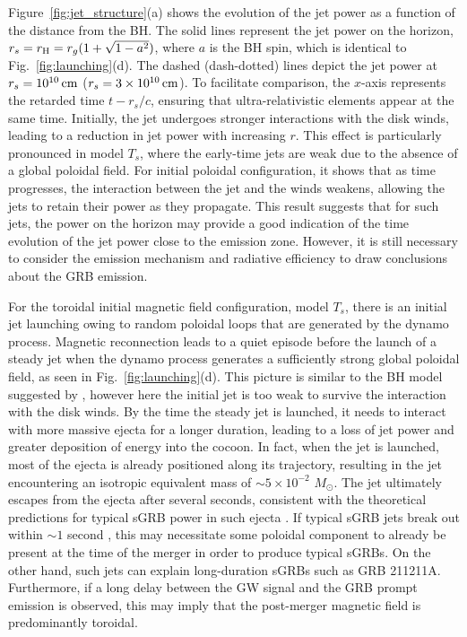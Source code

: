 \documentclass[twocolumn,dvipsnames]{aastex62}
\newcommand{\msun}{\,{M_{\odot}}}
\begin{document}
Figure~\ref{fig:jet_structure}(a) shows the evolution of the jet power as a function of the distance from the BH. The solid lines represent the jet power on the horizon, $ r_s = r_{\rm H} = r_g(1+\sqrt{1-a^2}) $, where $ a $ is the BH spin, which is identical to Fig.~\ref{fig:launching}(d). The dashed (dash-dotted) lines depict the jet power at $ r_s = 10^{10}\,{\rm cm} $ ($ r_s = 3\times 10^{10}\,{\rm cm} $). To facilitate comparison, the $ x $-axis represents the retarded time $ t - r_s/c $, ensuring that ultra-relativistic elements appear at the same time. Initially, the jet undergoes stronger interactions with the disk winds, leading to a reduction in jet power with increasing $ r $. This effect is particularly pronounced in model $ T_s $, where the early-time jets are weak due to the absence of a global poloidal field. For initial poloidal configuration, it shows that as time progresses, the interaction between the jet and the winds weakens, allowing the jets to retain their power as they propagate. This result suggests that for such jets, the power on the horizon may provide a good indication of the time evolution of the jet power close to the emission zone. However, it is still necessary to consider the emission mechanism and radiative efficiency to draw conclusions about the GRB emission.

For the toroidal initial magnetic field configuration, model $ T_s $, there is an initial jet launching owing to random poloidal loops that are generated by the dynamo process. Magnetic reconnection leads to a quiet episode before the launch of a steady jet when the dynamo process generates a sufficiently strong global poloidal field, as seen in Fig.~\ref{fig:launching}(d). This picture is similar to the BH model suggested by \citet{Kisaka2015}, however here the initial jet is too weak to survive the interaction with the disk winds. By the time the steady jet is launched, it needs to interact with more massive ejecta for a longer duration, leading to a loss of jet power and greater deposition of energy into the cocoon. In fact, when the jet is launched, most of the ejecta is already positioned along its trajectory, resulting in the jet encountering an isotropic equivalent mass of $ \sim 5\times 10^{-2}\,\msun $. The jet ultimately escapes from the ejecta after several seconds, consistent with the theoretical predictions for typical sGRB power in such ejecta \citep{Gottlieb2021a,Gottlieb2022f}. If typical sGRB jets break out within $ \sim 1 $ second \citep{Moharana2017}, this may necessitate some poloidal component to already be present at the time of the merger in order to produce typical sGRBs. On the other hand, such jets can explain long-duration sGRBs such as GRB 211211A. Furthermore, if a long delay between the GW signal and the GRB prompt emission is observed, this may imply that the post-merger magnetic field is predominantly toroidal.
\end{document}
